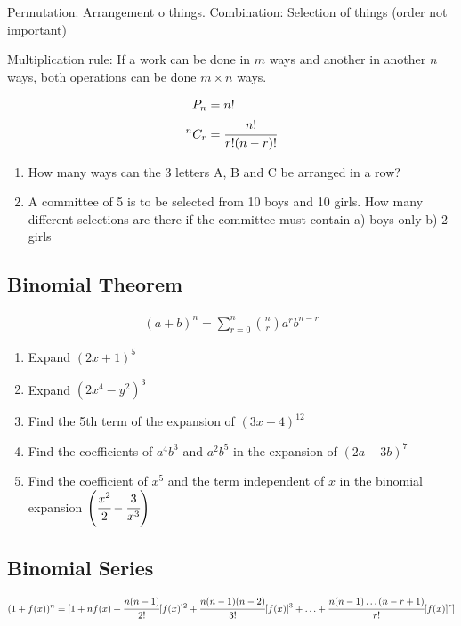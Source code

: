\documentclass[letterpaper]{article}
\begin{document}
Permutation: Arrangement o things. Combination: Selection of things (order not important)

Multiplication rule: If a work can be done in $m$ ways and another in another $n$ ways, both operations can be done $m \times n$ ways.

\begin{align*}
P_n &= n! \\
^nC_r &= \cfrac{n!}{r!(n-r)!}
\end{align*}

\begin{enumerate}
\item How many ways can the 3 letters A, B and C be arranged in a row?

\item A committee of 5 is to be selected from 10 boys and 10 girls. How many different selections are there if the committee must contain a) boys only b) 2 girls
\end{enumerate}

\subsection{Binomial Theorem}

\begin{align*}
(a + b)^n = \sum_{r=0}^n {n \choose r} a^r b^{n-r}
\end{align*}

\begin{enumerate}
\item Expand $(2x + 1)^5$

\item Expand $(2x^4 - y^2)^3$

\item Find the 5th term of the expansion of $(3x - 4)^{12}$

\item Find the coefficients of $a^4b^3$ and $a^2b^5$ in the expansion of $(2a - 3b)^7$

\item Find the coefficient of $x^5$ and the term independent of $x$ in the binomial expansion $\left(\cfrac{x^2}{2} - \cfrac{3}{x^3}\right)$
\end{enumerate}

\subsection{Binomial Series}

\begin{align*}
(1 + f(x))^n = [1 + nf(x) + \cfrac{n(n-1)}{2!}[f(x)]^2 + \cfrac{n(n-1)(n-2)}{3!} [f(x)]^3 + \ldots + \cfrac{n(n-1)\ldots(n-r+1)}{r!} [f(x)]^r]
\end{align*}
\end{document}
